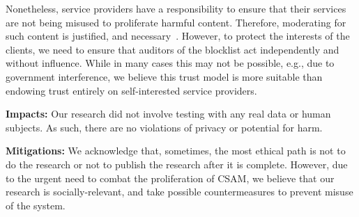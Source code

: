 \documentclass[conference,compsoc]{IEEEtran}
\begin{document}
Nonetheless, service providers have a responsibility to ensure that their services are not being misused to proliferate harmful content. Therefore, moderating for such content is justified, and necessary~\cite{howard2023ethics}. However, to protect the interests of the clients, we need to ensure that auditors of the blocklist act independently and without influence. While in many cases this may not be possible, e.g., due to government interference, we believe this trust model is more suitable than endowing trust entirely on self-interested service providers. 



\item \textbf{Impacts:} Our research did not involve testing with any real data or human subjects. As such, there are no violations of privacy or potential for harm. 

\item \textbf{Mitigations:} 
%
We acknowledge that, sometimes, the most ethical path is not to do the research or not to publish the research after it is complete. However, 
due to the urgent need to combat the proliferation of CSAM, we believe that our research is socially-relevant, and take possible countermeasures to prevent misuse of the system. 
\enumListEnd
\fi




{\small


}

\appendices

\end{document}
